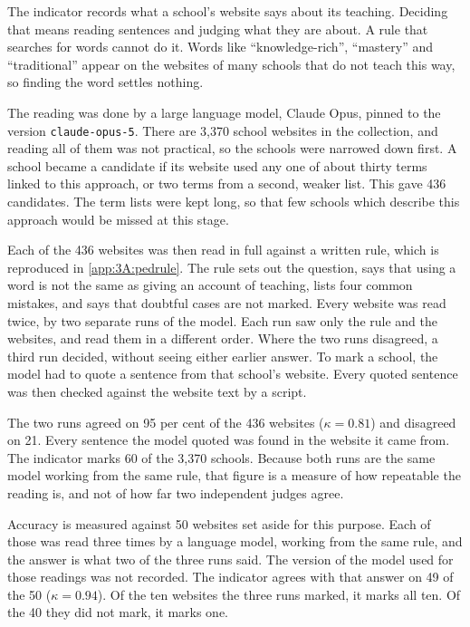 The indicator records what a school's website says about its teaching.
Deciding that means reading sentences and judging what they are about. A rule
that searches for words cannot do it. Words like ``knowledge-rich'',
``mastery'' and ``traditional'' appear on the websites of many schools that do
not teach this way, so finding the word settles nothing.

The reading was done by a large language model, Claude Opus, pinned to the
version \texttt{claude-opus-5}. There are 3,370 school websites in the
collection, and reading all of them was not practical, so the schools were
narrowed down first. A school became a candidate if its website used any one
of about thirty terms linked to this approach, or two terms from a second,
weaker list. This gave 436 candidates. The term lists were kept long, so that
few schools which describe this approach would be missed at this stage.

Each of the 436 websites was then read in full against a written rule, which
is reproduced in \cref{app:3A:pedrule}. The rule sets out the question, says
that using a word is not the same as giving an account of teaching, lists four
common mistakes, and says that doubtful cases are not marked. Every website
was read twice, by two separate runs of the model. Each run saw only the rule
and the websites, and read them in a different order. Where the two runs
disagreed, a third run decided, without seeing either earlier answer. To mark
a school, the model had to quote a sentence from that school's website. Every
quoted sentence was then checked against the website text by a script.

The two runs agreed on 95 per cent of the 436 websites ($\kappa = 0.81$) and
disagreed on 21. Every sentence the model quoted was found in the website it
came from. The indicator marks 60 of the 3,370 schools. Because both runs are
the same model working from the same rule, that figure is a measure of how
repeatable the reading is, and not of how far two independent judges agree.

Accuracy is measured against 50 websites set aside for this purpose. Each of
those was read three times by a language model, working from the same rule,
and the answer is what two of the three runs said. The version of the model
used for those readings was not recorded. The indicator agrees with that
answer on 49 of the 50 ($\kappa = 0.94$). Of the ten websites the three runs
marked, it marks all ten. Of the 40 they did not mark, it marks one.

